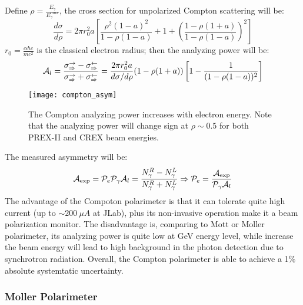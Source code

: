 Define $\rho = \frac{E_\gamma}{E_\gamma^{max}}$, the cross section for unpolarized
Compton scattering will be:
\begin{equation}
    \frac{d\sigma}{d\rho} = 2\pi r_0^2 a 
    \left[ \frac{\rho^2 (1-a)^2}{1 - \rho(1-a)} + 1 + \left( \frac{1 - \rho(1+a)}{1- \rho(1-a)}\right)^2\right]
\end{equation}
$r_0 = \frac{\alpha \hbar c}{mc^2}$ is the classical electron radius; then the
analyzing power will be:
\begin{equation}
    \mathcal{A}_l = \frac{\sigma^\rightarrow_\Rightarrow - \sigma^\leftarrow_\Rightarrow}
    {\sigma^\rightarrow_\Rightarrow + \sigma^\leftarrow_\Rightarrow}
    = \frac{2\pi r_0^2 a}{d\sigma/d\rho}(1 - \rho(1+a))\left[ 1 - \frac{1}{(1 - \rho(1-a))^2}\right]
\end{equation}
\begin{figure}
    \centering
    \texttt{[image: compton\_asym]}
    \caption{The Compton analyzing power increases with electron energy. Note
    that the analyzing power will change sign at $\rho \sim 0.5$ for both PREX-II
    and CREX beam energies.}
\end{figure}

The measured asymmetry will be:
\begin{equation*}
    \mathcal{A}_{\text{exp}} = \mathcal{P}_{e}\mathcal{P}_{\gamma}\mathcal{A}_{l} = \frac{N_{\gamma}^R - N_{\gamma}^L}{N_{\gamma}^R + N_{\gamma}^L}
    \Rightarrow
    \mathcal{P}_e = \frac{\mathcal{A}_{\text{exp}}}{\mathcal{P}_{\gamma}\mathcal{A}_{l}}
\end{equation*}
The advantage of the Compoton polarimeter is that it can tolerate quite high current
(up to $\sim 200 \ \mu A$ at JLab), plus its non-invasive operation make it a beam 
polarization monitor. The disadvantage is, comparing to Mott or Moller polarimeter,
its analyzing power is quite low at GeV energy level, while increase the beam
energy will lead to high background in the photon detection due to synchrotron 
radiation. Overall, the Compton polarimeter is able to achieve a 1\% absolute systemtatic
uncertainty.

\subsubsection{Moller Polarimeter}
\begin{comment}
low current only
\end{comment}

